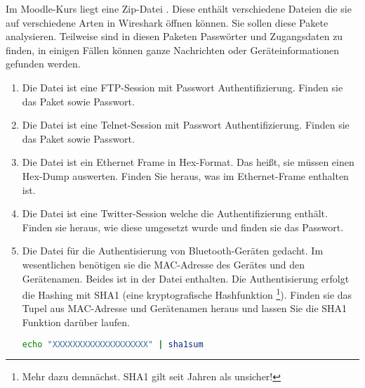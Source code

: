 \documentclass[paper=a4,fontsize=11pt]{scrartcl}%
\begin{document}
Im Moodle-Kurs liegt eine Zip-Datei . Diese enthält verschiedene Dateien die sie auf verschiedene Arten in Wireshark öffnen können. Sie sollen diese Pakete analysieren. Teilweise sind in diesen Paketen Passwörter und Zugangsdaten zu finden, in einigen Fällen können ganze Nachrichten oder Geräteinformationen gefunden werden.
\begin{enumerate}
	\item Die Datei  ist eine FTP-Session mit Passwort Authentifizierung. Finden sie das Paket sowie Passwort.
	\item Die Datei  ist eine Telnet-Session mit Passwort Authentifizierung. Finden sie das Paket sowie Passwort.
	\item Die Datei  ist ein Ethernet Frame in Hex-Format. Das heißt, sie müssen einen Hex-Dump auswerten. Finden Sie heraus, was im Ethernet-Frame enthalten ist.
	\item Die Datei  ist eine Twitter-Session welche die Authentifizierung enthält. Finden sie heraus, wie diese umgesetzt wurde und finden sie das Passwort.
	\item Die Datei  für die Authentisierung von Bluetooth-Geräten gedacht. Im wesentlichen benötigen sie die MAC-Adresse des Gerätes und den Gerätenamen. Beides ist in der Datei enthalten. Die Authentisierung erfolgt die Hashing mit SHA1 (eine kryptografische Hashfunktion \footnote{Mehr dazu demnächst. SHA1 gilt seit Jahren als unsicher!}). Finden sie das Tupel aus MAC-Adresse und Gerätenamen heraus und lassen Sie die SHA1 Funktion darüber laufen.
	\begin{lstlisting}[style=Bash, language=Bash]
echo "XXXXXXXXXXXXXXXXXXX" | sha1sum
\end{lstlisting}
\end{enumerate}
\end{document}
